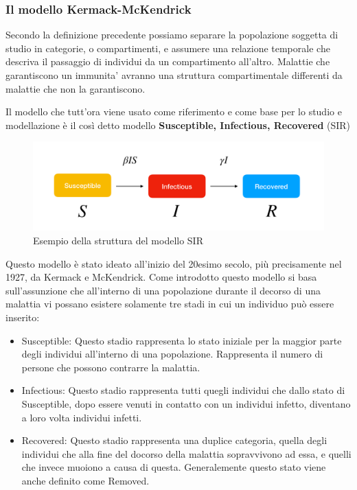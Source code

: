 \subsubsection{Il modello Kermack-McKendrick}
Secondo la definizione precedente possiamo separare la popolazione soggetta di studio 
in categorie, o compartimenti, e assumere una relazione temporale che descriva il passaggio 
di individui da un compartimento all'altro. Malattie che garantiscono un immunita' avranno 
una struttura compartimentale differenti da malattie che non la garantiscono.

Il modello che tutt'ora viene usato come riferimento e come base per 
lo studio e modellazione è il così detto modello 
\textbf{Susceptible, Infectious, Recovered} (SIR)

\begin{figure}[h]
    \includegraphics[width=\linewidth]{img/sir.png}
    \caption{Esempio della struttura del modello SIR} 
    \label{fig:SIR_Structure}
\end{figure}

Questo modello è stato ideato all'inizio del 20esimo secolo, 
più precisamente nel 1927, da Kermack e McKendrick. Come introdotto questo modello
si basa sull'assunzione che all'interno di una popolazione durante 
il decorso di una malattia vi possano esistere solamente tre stadi in cui 
un individuo può essere inserito: 

\begin{itemize}
    \item Susceptible: Questo stadio rappresenta lo stato iniziale per la maggior parte
    degli individui all'interno di una popolazione. Rappresenta il numero di 
    persone che possono contrarre la malattia.
    \item Infectious: Questo stadio rappresenta tutti quegli individui che dallo 
    stato di Susceptible, dopo essere venuti in contatto con un individui infetto, 
    diventano a loro volta individui infetti.
    \item Recovered: Questo stadio rappresenta una duplice categoria, quella degli
    individui che alla fine del docorso della malattia sopravvivono ad essa, e 
    quelli che invece muoiono a causa di questa. Generalemente questo stato viene
    anche definito come Removed.
\end{itemize}

